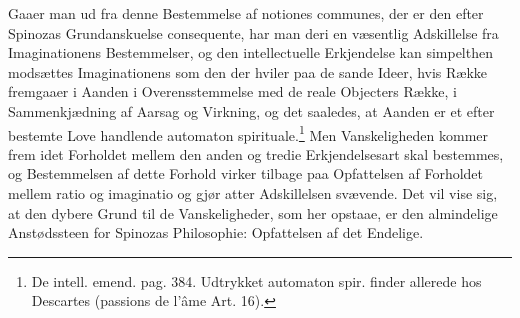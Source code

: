 \documentclass[12pt,a4paper]{book}
\begin{document}
Gaaer man ud fra denne Bestemmelse af notiones communes, der er den
efter Spinozas Grundanskuelse consequente, har man deri en væsentlig
Adskillelse fra Imaginationens Bestemmelser, og den intellectuelle
Erkjendelse kan simpelthen modsættes Imaginationens som den der
hviler paa de sande Ideer, hvis Række fremgaaer i Aanden i
Overensstemmelse med de reale Objecters Række, i Sammenkjædning af
Aarsag og Virkning, og det saaledes, at Aanden er et efter bestemte
Love handlende automaton spirituale.\footnote{De intell. emend. pag.
384. Udtrykket automaton spir. finder allerede hos Descartes
(passions de l'âme Art. 16).} Men Vanskeligheden kommer frem idet
Forholdet mellem den anden og tredie Erkjendelsesart skal bestemmes,
og Bestemmelsen af dette Forhold virker tilbage paa Opfattelsen af
Forholdet mellem ratio og imaginatio og gjør atter Adskillelsen
svævende. Det vil vise sig, at den dybere Grund til de
Vanskeligheder, som her opstaae, er den almindelige Anstødssteen for
Spinozas Philosophie: Opfattelsen af det Endelige.
\end{document}
